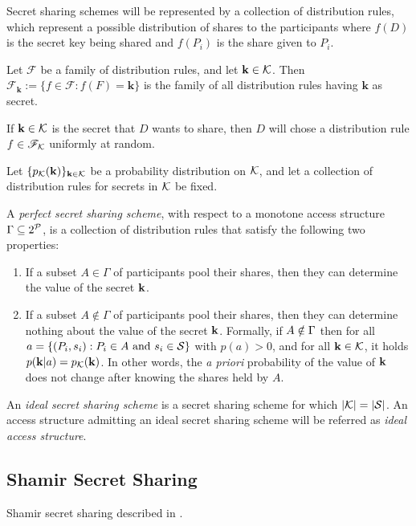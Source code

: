 Secret sharing schemes will be represented by a collection of distribution rules, which represent a possible distribution of shares to the participants where $f(D)$ is the secret key being shared and $f(P_i)$ is the share given to $P_i$.

 Let $\mathscr{F}$ be a family of distribution rules, and let $\mathbf{k} \in \mathcal{K}$. Then $\mathscr{F}_{\mathbf{k}} := \{ f \in \mathscr{F} : f(F) = \mathbf{k}\}$ is the family of all distribution rules having $\mathbf{k}$ as secret.

If $\mathbf{k} \in \mathcal{K}$ is the secret that $D$ wants to share, then $D$ will chose a distribution rule $f \in {\mathscr F}_{\mathcal{K}}$ uniformly at random.


Let $\{p_{\mathcal{K}} (\mathbf{k}) \}_{\mathbf{k} \in \mathcal{K}}$ be a probability distribution on $\mathcal{K}$, and let a collection of distribution rules for secrets in $\mathcal{K}$ be fixed.

 A \textit{perfect secret sharing scheme}, with respect to a monotone access structure $\Gamma \subseteq 2^{{\mathcal P}}$, is a collection of distribution rules that satisfy the following two properties:
\begin{enumerate}
    \item If a subset $A \in \Gamma$ of participants pool their shares, then they can determine the value of the secret $\mathbf{k}$.
    \item If a subset $A \notin \Gamma$ of participants pool their shares, then they can determine nothing about the value of the secret $\mathbf{k}$. Formally, if $A \notin \Gamma$ then for all $a = \{ (P_i, s_i): P_i \in A \text{ and } s_i \in \mathcal{S} \}$ with $p(a)>0$, and for all $\mathbf{k} \in \mathcal{K}$, it holds $p(\mathbf{k} \vert a) = p_{\mathcal{K}}(\mathbf{k})$. In other words, the \textit{a priori} probability of the value of $\mathbf{k}$ does not change after knowing the shares held by $A$.
\end{enumerate}

 An \textit{ideal secret sharing scheme} is a secret sharing scheme for which $\vert \mathcal{K} \vert = \vert \mathcal{S} \vert$. An access structure admitting an ideal secret sharing scheme will be referred as \textit{ideal access structure}.


\subsection{Shamir Secret Sharing}
Shamir secret sharing described in \cite{Sham79}.

